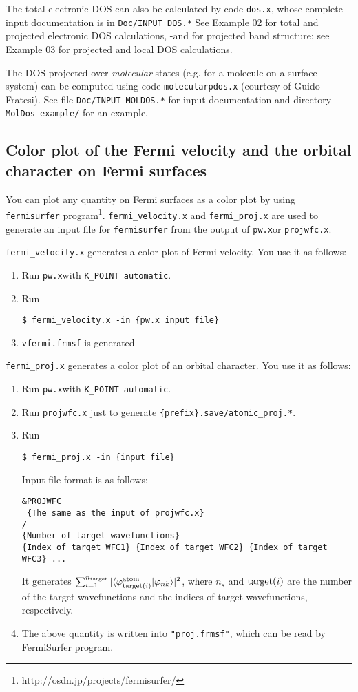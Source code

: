 \documentclass[12pt,a4paper]{article}
\def\pwx{\texttt{pw.x}}
\begin{document}
The total electronic DOS can also be calculated by code \texttt{dos.x},
whose complete input documentation is in \texttt{Doc/INPUT\_DOS.*}
See Example 02 for total and projected electronic DOS calculations,
-and for projected band structure;
see Example 03 for projected and local DOS calculations.

The DOS projected over {\em molecular} states (e.g. for a molecule on
a surface system) can be computed using code \texttt{molecularpdos.x}
(courtesy of Guido Fratesi). See file \texttt{Doc/INPUT\_MOLDOS.*}
for input documentation and directory \texttt{MolDos\_example/} for
an example.

\subsection{Color plot of the Fermi velocity and the orbital character
  on Fermi surfaces}

You can plot any quantity on Fermi surfaces as a color plot 
by using \verb|fermisurfer| program\footnote{http://osdn.jp/projects/fermisurfer/}.
\verb|fermi_velocity.x| and \verb|fermi_proj.x| are used 
to generate an input file for \verb|fermisurfer| from the output
of \pwx or \verb|projwfc.x|.

\verb|fermi_velocity.x| generates a color-plot of Fermi velocity.
You use it as follows:
\begin{enumerate}
\item Run \pwx with \verb|K_POINT automatic|.
\item Run 
\begin{verbatim}
$ fermi_velocity.x -in {pw.x input file}
\end{verbatim}  
\item \verb|vfermi.frmsf| is generated
\end{enumerate}

\verb|fermi_proj.x| generates a color plot of an orbital character.
You use it as follows:
\begin{enumerate}
\item Run \pwx with \verb|K_POINT automatic|.
\item Run \verb|projwfc.x| just to generate \verb|{prefix}.save/atomic_proj.*|.
\item Run 
\begin{verbatim}
$ fermi_proj.x -in {input file}
\end{verbatim}
Input-file format is as follows:
\begin{verbatim}
&PROJWFC
 {The same as the input of projwfc.x}
/
{Number of target wavefunctions}
{Index of target WFC1} {Index of target WFC2} {Index of target WFC3} ...
\end{verbatim}
It generates 
$\sum_{i=1}^{n_{\rm target}} |\langle \varphi_{{\rm target}(i)}^{\rm atom}|\varphi_{n k} \rangle|^2$, 
where $n_s$ and ${\rm target}(i)$ are
the number of the target wavefunctions
and the indices of target wavefunctions, respectively.
\item The above quantity is written into \verb|"proj.frmsf"|,
  which can be read by FermiSurfer program.
\end{enumerate}
\end{document}
